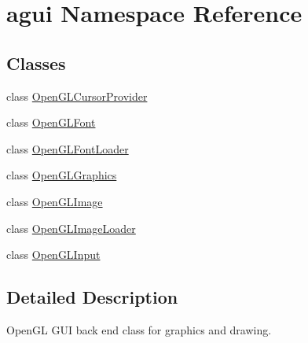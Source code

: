 \hypertarget{namespaceagui}{}\section{agui Namespace Reference}
\label{namespaceagui}
\subsection*{Classes}
\begin{DoxyCompactItemize}
\item 
class \mbox{\hyperlink{classagui_1_1_open_g_l_cursor_provider}{Open\+G\+L\+Cursor\+Provider}}
\item 
class \mbox{\hyperlink{classagui_1_1_open_g_l_font}{Open\+G\+L\+Font}}
\item 
class \mbox{\hyperlink{classagui_1_1_open_g_l_font_loader}{Open\+G\+L\+Font\+Loader}}
\item 
class \mbox{\hyperlink{classagui_1_1_open_g_l_graphics}{Open\+G\+L\+Graphics}}
\item 
class \mbox{\hyperlink{classagui_1_1_open_g_l_image}{Open\+G\+L\+Image}}
\item 
class \mbox{\hyperlink{classagui_1_1_open_g_l_image_loader}{Open\+G\+L\+Image\+Loader}}
\item 
class \mbox{\hyperlink{classagui_1_1_open_g_l_input}{Open\+G\+L\+Input}}
\end{DoxyCompactItemize}


\subsection{Detailed Description}
Open\+GL G\+UI back end class for graphics and drawing. 
